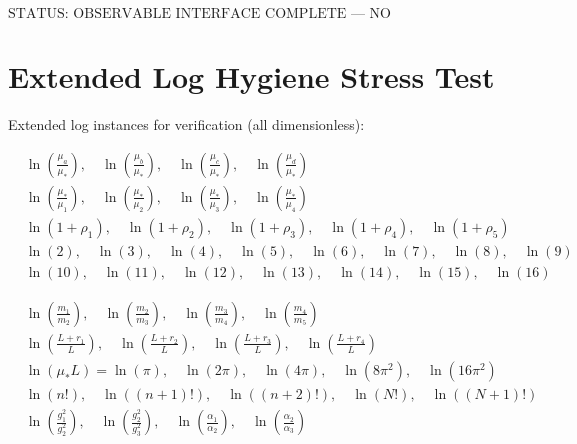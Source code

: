 \documentclass[11pt,a4paper]{article}
\theoremstyle{definition}
\begin{document}
\begin{equation}
\label{eq:final_status}
\text{STATUS: OBSERVABLE INTERFACE COMPLETE --- NO CONTAMINATION}
\end{equation}

\section{Extended Log Hygiene Stress Test}
\label{app:log_extended}

Extended log instances for verification (all dimensionless):

\begin{align}
\label{eq:log_add_1}
&\ln\left(\frac{\mu_a}{\mu_*}\right), \quad \ln\left(\frac{\mu_b}{\mu_*}\right), \quad \ln\left(\frac{\mu_c}{\mu_*}\right), \quad \ln\left(\frac{\mu_d}{\mu_*}\right) \\
\label{eq:log_add_2}
&\ln\left(\frac{\mu_*}{\mu_1}\right), \quad \ln\left(\frac{\mu_*}{\mu_2}\right), \quad \ln\left(\frac{\mu_*}{\mu_3}\right), \quad \ln\left(\frac{\mu_*}{\mu_4}\right) \\
\label{eq:log_add_3}
&\ln(1 + \rho_1), \quad \ln(1 + \rho_2), \quad \ln(1 + \rho_3), \quad \ln(1 + \rho_4), \quad \ln(1 + \rho_5) \\
\label{eq:log_add_4}
&\ln(2), \quad \ln(3), \quad \ln(4), \quad \ln(5), \quad \ln(6), \quad \ln(7), \quad \ln(8), \quad \ln(9) \\
\label{eq:log_add_5}
&\ln(10), \quad \ln(11), \quad \ln(12), \quad \ln(13), \quad \ln(14), \quad \ln(15), \quad \ln(16)
\end{align}

\begin{align}
\label{eq:log_add_6}
&\ln\left(\frac{m_1}{m_2}\right), \quad \ln\left(\frac{m_2}{m_3}\right), \quad \ln\left(\frac{m_3}{m_4}\right), \quad \ln\left(\frac{m_4}{m_5}\right) \\
\label{eq:log_add_7}
&\ln\left(\frac{L + r_1}{L}\right), \quad \ln\left(\frac{L + r_2}{L}\right), \quad \ln\left(\frac{L + r_3}{L}\right), \quad \ln\left(\frac{L + r_4}{L}\right) \\
\label{eq:log_add_8}
&\ln(\mu_* L) = \ln(\pi), \quad \ln(2\pi), \quad \ln(4\pi), \quad \ln(8\pi^2), \quad \ln(16\pi^2) \\
\label{eq:log_add_9}
&\ln(n!), \quad \ln((n+1)!), \quad \ln((n+2)!), \quad \ln(N!), \quad \ln((N+1)!) \\
\label{eq:log_add_10}
&\ln\left(\frac{g_1^2}{g_2^2}\right), \quad \ln\left(\frac{g_2^2}{g_3^2}\right), \quad \ln\left(\frac{\alpha_1}{\alpha_2}\right), \quad \ln\left(\frac{\alpha_2}{\alpha_3}\right)
\end{align}
\end{document}
